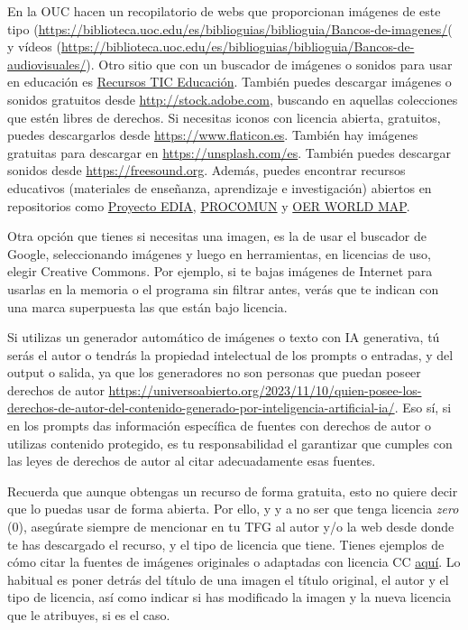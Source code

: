 En la OUC hacen un recopilatorio de webs que proporcionan imágenes de este tipo (\url{https://biblioteca.uoc.edu/es/biblioguias/biblioguia/Bancos-de-imagenes/}( y vídeos (\url{https://biblioteca.uoc.edu/es/biblioguias/biblioguia/Bancos-de-audiovisuales/}). Otro sitio que con un buscador de imágenes o sonidos para usar en educación es \href{http://recursostic.educacion.es}{Recursos TIC Educación}. También puedes descargar imágenes o sonidos gratuitos desde \url{http://stock.adobe.com}, buscando en aquellas colecciones que estén libres de derechos. Si necesitas iconos con licencia abierta, gratuitos, puedes descargarlos desde \url{https://www.flaticon.es}. También hay imágenes gratuitas para descargar en \url{https://unsplash.com/es}.
También puedes descargar sonidos desde \url{https://freesound.org}. Además, puedes encontrar recursos educativos  (materiales de enseñanza, aprendizaje e investigación) abiertos en repositorios como \href{cedec.intef.es}{Proyecto EDIA}, \href{procomun.educalab.es}{PROCOMUN} y \href{oerworldmap.org}{OER WORLD MAP}. 

Otra opción que tienes si necesitas una imagen, es la de usar el buscador de Google, seleccionando imágenes y luego en herramientas, en licencias de uso, elegir Creative Commons. Por ejemplo, si te bajas imágenes de Internet para usarlas en la memoria o el programa sin filtrar antes, verás que te indican con una marca superpuesta las que están bajo licencia. 


Si utilizas un generador automático de imágenes o texto con IA generativa, tú serás el autor o tendrás la propiedad intelectual de los prompts o entradas, y del output o salida, ya que los generadores no son personas que puedan poseer derechos de autor \url{https://universoabierto.org/2023/11/10/quien-posee-los-derechos-de-autor-del-contenido-generado-por-inteligencia-artificial-ia/}. Eso sí, si en los prompts das información específica de fuentes con derechos de autor o utilizas contenido protegido, es tu responsabilidad el garantizar que cumples con las leyes de derechos de autor al citar adecuadamente esas fuentes.

Recuerda que aunque obtengas un recurso de forma gratuita, esto no quiere decir que lo puedas usar de forma abierta. Por ello, y y a no ser que tenga licencia \textit{zero} (0), asegúrate siempre de mencionar en tu TFG al autor y/o la web desde donde te has descargado el recurso, y el tipo de licencia que tiene. Tienes ejemplos de cómo citar la fuentes de imágenes originales o adaptadas con licencia CC \href{https://wiki.creativecommons.org/wiki/Recommended_practices_for_attribution}{aquí}. Lo habitual es poner detrás del título de una imagen el título original, el autor y el tipo de licencia, así como indicar si has modificado la imagen y la nueva licencia que le atribuyes, si es el caso.

